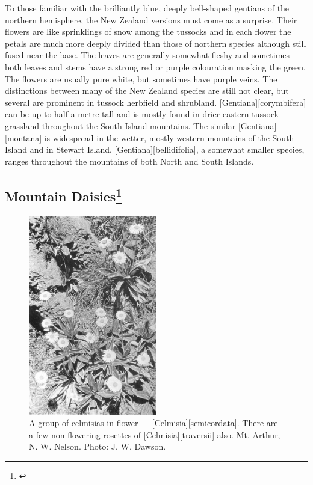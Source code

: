 To those familiar with the brilliantly blue, deeply bell-shaped gentians of the northern hemisphere, the New Zealand versions must come as a surprise.
Their flowers are like sprinklings of snow among the tussocks and in each flower the petals are much more deeply divided than those of northern species although still fused near the base.
The leaves are generally somewhat fleshy and sometimes both leaves and stems have a strong red or purple colouration masking the green.
The flowers are usually pure white, but sometimes have purple veins.
The distinctions between many of the New Zealand species are still not clear, but several are prominent in tussock herbfield and shrubland. [Gentiana][corymbifera] can be up to half a metre tall and is mostly found in drier eastern tussock grassland throughout the South Island mountains.
The similar [Gentiana][montana] is widespread in the wetter, mostly western mountains of the South Island and in Stewart Island. [Gentiana][bellidifolia], a somewhat smaller species, ranges throughout the mountains of both North and South Islands.

\subsection[Mountain Daisies]{Mountain Daisies\footnote{\cite{given1969synopsis}}}

\begin{figure}
	\includegraphics[width=0.5\textwidth]{graphics/figure102celmisias.jpg}
	\centering
	\caption[A group of celmisias in flower]{A group of celmisias in flower --- [Celmisia][semicordata].
	There are a few non-flowering rosettes of [Celmisia][traversii] also.
	Mt. Arthur,  N. W. Nelson.
	Photo: J. W. Dawson.}%
	\label{fig:102celmisias}
\end{figure}


